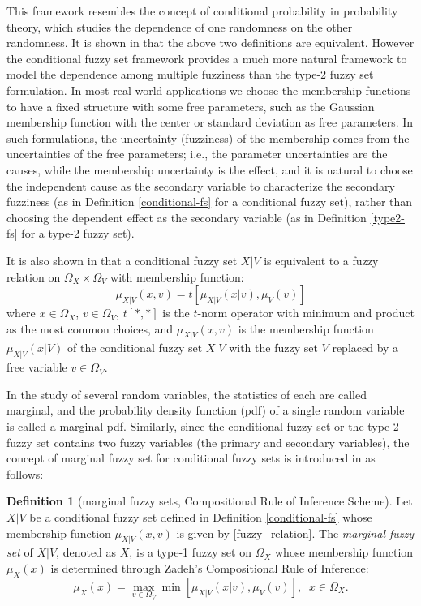 \documentclass[journal,transmag]{IEEEtran}
\theoremstyle{definition}
\newtheorem{definition}{Definition}
\begin{document}
This framework resembles the concept of conditional probability in probability theory, which studies the dependence of one randomness on the other randomness. It is shown in \cite{wang_new_2016} that the above two definitions are equivalent. However the conditional fuzzy set framework provides a much more natural framework to model the dependence among multiple fuzziness than the type-2 fuzzy set formulation.
In most real-world applications we choose the membership functions to have a fixed structure with some free parameters, such as the Gaussian membership function with the center or standard deviation as free parameters. In such formulations, the uncertainty (fuzziness) of the membership comes from the uncertainties of the free parameters; i.e., the parameter uncertainties are the causes, while the membership uncertainty is the effect, and it is natural to choose the independent cause as the secondary variable to characterize the secondary fuzziness (as in Definition \ref{conditional-fs} for a conditional fuzzy set), rather than choosing the dependent effect as the secondary variable (as in Definition \ref{type2-fs} for a type-2 fuzzy set).

It is also shown in \cite{wang_new_2016} that a conditional fuzzy set $X|V$ is equivalent to a fuzzy relation \cite{wang_course_1997} on $\Omega_X\times\Omega_V$ with membership function:
\begin{equation}
\label{fuzzy_relation}
\mu_{X|V}(x,v)=t[\mu_{X|V}(x|v),\mu_V(v)]
\end{equation}
where $x\in\Omega_X$, $v\in\Omega_V$, $t[*,*]$ is the $t$-norm operator with minimum and product as the most common choices, and $\mu_{X|V}(x,v)$ is the membership function $\mu_{X|V}(x|V)$ of the conditional fuzzy set $X|V$ with the fuzzy set $V$  replaced by a free variable $v\in\Omega_V$.

In the study of several random variables, the statistics of each are called marginal, and the probability density function (pdf) of a single random variable is called a marginal pdf. Similarly, since the conditional fuzzy set or the type-2 fuzzy set contains two fuzzy variables (the primary and secondary variables), the concept of marginal fuzzy set for conditional fuzzy sets is introduced in \cite{wang_new_2016} as follows:

\begin{definition}[marginal fuzzy sets, Compositional Rule of Inference Scheme]
\label{marginal-fs}
Let $X|V$ be a conditional fuzzy set defined in Definition \ref{conditional-fs} whose membership function $\mu_{X|V}(x,v)$ is given by \eqref{fuzzy_relation}. The \emph{marginal fuzzy set} of $X|V$, denoted as $X$, is a type-1 fuzzy set on $\Omega_X$ whose membership function $\mu_X(x)$ is determined through Zadeh's Compositional Rule of Inference:
\begin{equation}
\label{marginal_fs}
\mu_X(x)=\max_{v\in\Omega_V}\min[\mu_{X|V}(x|v),\mu_V(v)],\;\;x\in\Omega_X.
\end{equation}
\end{definition}
\end{document}
